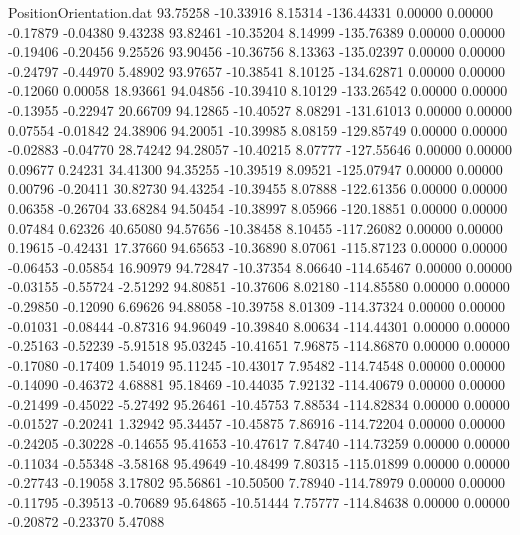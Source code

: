 \begin{filecontents}{PositionOrientation.dat}
  93.75258  -10.33916    8.15314  -136.44331    0.00000    0.00000   -0.17879   -0.04380    9.43238
  93.82461  -10.35204    8.14999  -135.76389    0.00000    0.00000   -0.19406   -0.20456    9.25526
  93.90456  -10.36756    8.13363  -135.02397    0.00000    0.00000   -0.24797   -0.44970    5.48902
  93.97657  -10.38541    8.10125  -134.62871    0.00000    0.00000   -0.12060    0.00058   18.93661
  94.04856  -10.39410    8.10129  -133.26542    0.00000    0.00000   -0.13955   -0.22947   20.66709
  94.12865  -10.40527    8.08291  -131.61013    0.00000    0.00000    0.07554   -0.01842   24.38906
  94.20051  -10.39985    8.08159  -129.85749    0.00000    0.00000   -0.02883   -0.04770   28.74242
  94.28057  -10.40215    8.07777  -127.55646    0.00000    0.00000    0.09677    0.24231   34.41300
  94.35255  -10.39519    8.09521  -125.07947    0.00000    0.00000    0.00796   -0.20411   30.82730
  94.43254  -10.39455    8.07888  -122.61356    0.00000    0.00000    0.06358   -0.26704   33.68284
  94.50454  -10.38997    8.05966  -120.18851    0.00000    0.00000    0.07484    0.62326   40.65080
  94.57656  -10.38458    8.10455  -117.26082    0.00000    0.00000    0.19615   -0.42431   17.37660
  94.65653  -10.36890    8.07061  -115.87123    0.00000    0.00000   -0.06453   -0.05854   16.90979
  94.72847  -10.37354    8.06640  -114.65467    0.00000    0.00000   -0.03155   -0.55724   -2.51292
  94.80851  -10.37606    8.02180  -114.85580    0.00000    0.00000   -0.29850   -0.12090    6.69626
  94.88058  -10.39758    8.01309  -114.37324    0.00000    0.00000   -0.01031   -0.08444   -0.87316
  94.96049  -10.39840    8.00634  -114.44301    0.00000    0.00000   -0.25163   -0.52239   -5.91518
  95.03245  -10.41651    7.96875  -114.86870    0.00000    0.00000   -0.17080   -0.17409    1.54019
  95.11245  -10.43017    7.95482  -114.74548    0.00000    0.00000   -0.14090   -0.46372    4.68881
  95.18469  -10.44035    7.92132  -114.40679    0.00000    0.00000   -0.21499   -0.45022   -5.27492
  95.26461  -10.45753    7.88534  -114.82834    0.00000    0.00000   -0.01527   -0.20241    1.32942
  95.34457  -10.45875    7.86916  -114.72204    0.00000    0.00000   -0.24205   -0.30228   -0.14655
  95.41653  -10.47617    7.84740  -114.73259    0.00000    0.00000   -0.11034   -0.55348   -3.58168
  95.49649  -10.48499    7.80315  -115.01899    0.00000    0.00000   -0.27743   -0.19058    3.17802
  95.56861  -10.50500    7.78940  -114.78979    0.00000    0.00000   -0.11795   -0.39513   -0.70689
  95.64865  -10.51444    7.75777  -114.84638    0.00000    0.00000   -0.20872   -0.23370    5.47088

\end{filecontents}
